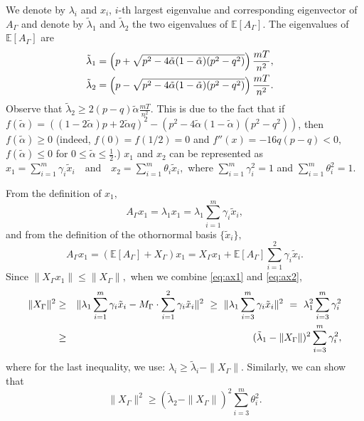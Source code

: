   We denote by $\lambda_i$ and $x_i$, $i$-th largest eigenvalue and
  corresponding eigenvector of $A_{\Gamma}$ and denote by
  $\tilde{\lambda}_1$ and $\tilde{\lambda}_2$ the two eigenvalues of $\mathbb{E}[A_{\Gamma}].$ %
The eigenvalues of $\mathbb{E}[A_{\Gamma}]$ are 
\begin{align*}\tilde{\lambda}_1 &= \left( p+\sqrt{p^2 - 4\tilde{\alpha}(1-
     \tilde{ \alpha} ) (p^2 - q^2)}\right) \frac{mT}{n^2} ,\cr
\tilde{\lambda}_2 &= \left(p-\sqrt{p^2 - 4\tilde{\alpha} (1-\tilde{\alpha}) (p^2 -
    q^2)}\right) \frac{mT}{n^2}.\end{align*}
Observe that $\tilde{\lambda}_2 \ge 2(p-q)\tilde{\alpha} \frac{mT}{n^2}$. This is due to the fact that if $f(\tilde{\alpha}) = \left((1-2\tilde{\alpha}) p + 2\tilde{\alpha} q \right)^2 -\left( p^2 -4\tilde{\alpha}(1-\tilde{\alpha})(p^2 - q^2)\right)$, then $f(\tilde{\alpha})\ge 0$ (indeed, $f(0)=f(1/2)=0$ and $f''(x) = -16q(p-q)<0,$ $f(\tilde{\alpha})\le 0$ for $0 \le \tilde{\alpha} \le \frac{1}{2}.$) $x_1$ and $x_2$ can be represented as $x_1 = \sum_{i=1}^{m} \gamma_i \tilde{x}_i \quad \mbox{and} \quad x_2 = \sum_{i=1}^{m} \theta_i \tilde{x}_i,$ where $\sum_{i=1}^{m} \gamma_i^2 =1$ and $\sum_{i=1}^{m} \theta_i^2 =1$.

From the definition of $x_1,$
\begin{equation}
  A_{\Gamma} x_1  =  \lambda_1 x_1 = \lambda_1\sum_{i=1}^{m}
  \gamma_i \tilde{x}_i ,\label{eq:ax1}
\end{equation}
and from the definition of the othornormal basis $\{\tilde{x}_i \},$
\begin{equation}
 A_{\Gamma}x_1  = (\mathbb{E}[A_{\Gamma}]+X_{\Gamma})x_1=
 X_{\Gamma}x_1 + \mathbb{E}[A_{\Gamma}] \sum_{i=1}^{2}\gamma_i \tilde{x}_i. \label{eq:ax2}
\end{equation}
Since $\| X_{\Gamma} x_1\| \le \| X_{\Gamma} \|,$ when we combine \eqref{eq:ax1}
and \eqref{eq:ax2},
\begin{eqnarray}
\|X_{\Gamma}\|^2 & \ge & \| \lambda_1\sum_{i=1}^{m} \gamma_i \tilde{x}_i  - M_{\Gamma} \cdot \sum_{i=1}^{2}\gamma_i \tilde{x}_i  \|^2 
 ~ \ge~  \| \lambda_1\sum_{i=3}^{m} \gamma_i \tilde{x}_i \|^2 ~=~
 \lambda_1^2 \sum_{i=3}^{m} \gamma_i^2 \cr
& \ge & (\tilde{\lambda}_1 - \|X_{\Gamma}\|)^2\sum_{i=3}^{m}
\gamma_i^2 , \label{eq:xgamma}
\end{eqnarray}
where for the last inequality, we use: $\lambda_i \ge \tilde{\lambda}_i - \|X_{\Gamma}\|$.
Similarly, we can show that
\begin{equation}\|X_{\Gamma}\|^2 \ge  (\tilde{\lambda}_2 -
\|X_{\Gamma}\|)^2\sum_{i=3}^{m} \theta_i^2 .\label{eq:xgamma2}\end{equation}

